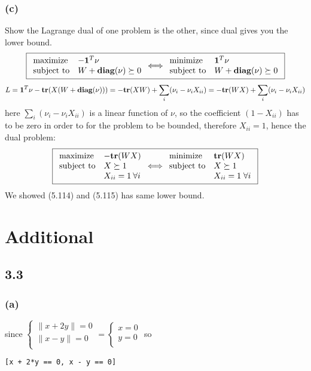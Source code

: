 \documentclass{article}
\newcommand{\tr}{{\mbox{\bf tr}}}
\newcommand{\diag}{{\mbox{\bf diag}}}
\begin{document}
\subsubsection*{(c)}
Show the Lagrange dual of one problem is the other, since dual gives you the lower bound.
\[\boxed{ \begin{array}{ll}
    \mbox{maximize}   &  -{\bf 1}^T\nu\\
    \mbox{subject to} & W + \diag(\nu) \succeq 0
             \end{array}    \Longleftrightarrow \begin{array}{ll}
    \mbox{minimize}   &  {\bf 1}^T\nu\\
    \mbox{subject to} & W + \diag(\nu) \succeq 0
             \end{array} }\]
             \[L = {\bf 1}^T \nu -\tr (X(W + \diag(\nu))) = -\tr (XW) + \sum_i (\nu_i - \nu_iX_{ii}) = -\tr (WX) + \sum_i (\nu_i - \nu_iX_{ii})  \]
           here $  \sum_i (\nu_i - \nu_iX_{ii}) $ is a linear function of $\nu$, so the coefficient $(1 - X_{ii})$ has to be zero in order to for the problem to be bounded, therefore $X_{ii} =1$, hence the dual problem: 
\[\boxed{
\begin{array}{ll}
    \mbox{maximize}   &  -\tr (WX)\\
    \mbox{subject to}  &X \succeq 1 \\
    & X_{ii}  = 1 \: \forall i 
             \end{array}    \Longleftrightarrow \begin{array}{ll}
    \mbox{minimize}   &  \tr (WX)\\
  \mbox{subject to} & X \succeq 1 \\
    & X_{ii} = 1 \; \forall i 
             \end{array} }\]
We showed (5.114) and (5.115) has same lower bound.

 \section*{Additional }
 \subsection*{3.3}
\subsubsection*{(a)}
since $\begin{cases}
\|x + 2y\| = 0\\
\|x - y\| = 0\\
\end{cases} = 
\begin{cases}
x = 0\\
y= 0\\
\end{cases}
$
so 
\begin{verbatim}
[x + 2*y == 0, x - y == 0]
\end{verbatim}
\end{document}

